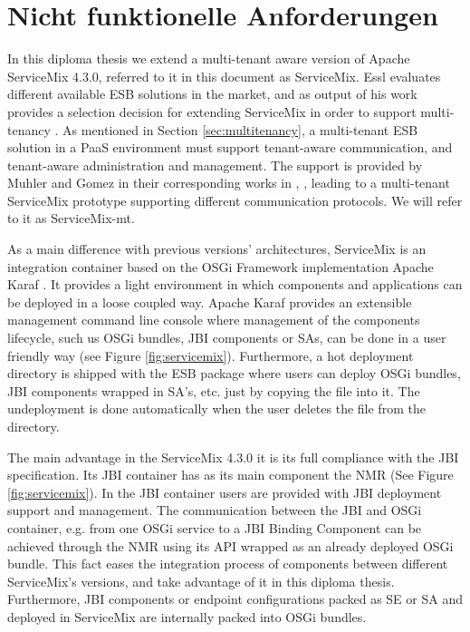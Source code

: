 \section{Nicht funktionelle Anforderungen}
\label{sec:NichtfunktionelleAnforderungen}  

In this diploma thesis we extend a multi-tenant aware version of Apache ServiceMix 4.3.0, referred to it in this document as ServiceMix. Essl evaluates different available \ac{ESB} solutions in the market, and as output of his work provides a selection decision for extending ServiceMix in order to support multi-tenancy \cite{Essl2011}. As mentioned in Section \ref{sec:multitenancy}, a multi-tenant \ac{ESB} solution in a \ac{PaaS} environment must support tenant-aware communication, and tenant-aware administration and management. The support is provided by Muhler and Gomez in their corresponding works in \cite{Muhler2012}, \cite{gomez2012}, leading to a multi-tenant ServiceMix prototype supporting different communication protocols. We will refer to it as ServiceMix-mt.

As a main difference with previous versions' architectures, ServiceMix is an integration container based on the \ac{OSGi} Framework implementation Apache Karaf  \cite{Karaf2011}. It provides a light environment in which components and applications can be deployed in a loose coupled way. Apache Karaf provides an extensible management command line console where management of the components lifecycle, such us \ac{OSGi} bundles, \ac{JBI} components or \ac{SA}s, can be done in a user friendly way (see Figure \ref{fig:servicemix}). Furthermore, a hot deployment directory is shipped with the \ac{ESB} package where users can deploy \ac{OSGi} bundles, \ac{JBI} components wrapped in \ac{SA}'s, etc. just by copying the file into it. The undeployment is done automatically when the user deletes the file from the  directory. 

The main advantage in the ServiceMix 4.3.0 it is its full compliance with the \ac{JBI} specification. Its \ac{JBI} container has as its main component the \ac{NMR} (See Figure \ref{fig:servicemix}). In the \ac{JBI} container users are provided with \ac{JBI} deployment support and management. The communication between the \ac{JBI} and \ac{OSGi} container, e.g. from one \ac{OSGi} service to a \ac{JBI} Binding Component can be achieved through the \ac{NMR} using its API wrapped as an already deployed \ac{OSGi} bundle. This fact eases the integration process of components between different ServiceMix's versions, and take advantage of it in this diploma thesis. Furthermore, \ac{JBI} components or endpoint configurations packed as \ac{SE} or \ac{SA} and deployed in ServiceMix are internally packed into \ac{OSGi} bundles. 

